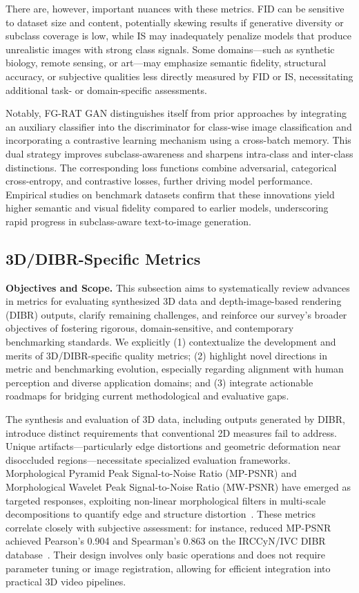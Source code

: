 \documentclass[sigconf]{acmart}
\begin{document}
There are, however, important nuances with these metrics. FID can be sensitive to dataset size and content, potentially skewing results if generative diversity or subclass coverage is low, while IS may inadequately penalize models that produce unrealistic images with strong class signals. Some domains—such as synthetic biology, remote sensing, or art—may emphasize semantic fidelity, structural accuracy, or subjective qualities less directly measured by FID or IS, necessitating additional task- or domain-specific assessments.

Notably, FG-RAT GAN distinguishes itself from prior approaches by integrating an auxiliary classifier into the discriminator for class-wise image classification and incorporating a contrastive learning mechanism using a cross-batch memory. This dual strategy improves subclass-awareness and sharpens intra-class and inter-class distinctions. The corresponding loss functions combine adversarial, categorical cross-entropy, and contrastive losses, further driving model performance. Empirical studies on benchmark datasets confirm that these innovations yield higher semantic and visual fidelity compared to earlier models, underscoring rapid progress in subclass-aware text-to-image generation.

\subsection{3D/DIBR-Specific Metrics}

\textbf{Objectives and Scope.} This subsection aims to systematically review advances in metrics for evaluating synthesized 3D data and depth-image-based rendering (DIBR) outputs, clarify remaining challenges, and reinforce our survey's broader objectives of fostering rigorous, domain-sensitive, and contemporary benchmarking standards. We explicitly (1) contextualize the development and merits of 3D/DIBR-specific quality metrics; (2) highlight novel directions in metric and benchmarking evolution, especially regarding alignment with human perception and diverse application domains; and (3) integrate actionable roadmaps for bridging current methodological and evaluative gaps.

The synthesis and evaluation of 3D data, including outputs generated by DIBR, introduce distinct requirements that conventional 2D measures fail to address. Unique artifacts—particularly edge distortions and geometric deformation near disoccluded regions—necessitate specialized evaluation frameworks. Morphological Pyramid Peak Signal-to-Noise Ratio (MP-PSNR) and Morphological Wavelet Peak Signal-to-Noise Ratio (MW-PSNR) have emerged as targeted responses, exploiting non-linear morphological filters in multi-scale decompositions to quantify edge and structure distortion~\cite{ref99}. These metrics correlate closely with subjective assessment: for instance, reduced MP-PSNR achieved Pearson's 0.904 and Spearman's 0.863 on the IRCCyN/IVC DIBR database~\cite{ref99}. Their design involves only basic operations and does not require parameter tuning or image registration, allowing for efficient integration into practical 3D video pipelines.
\end{document}
